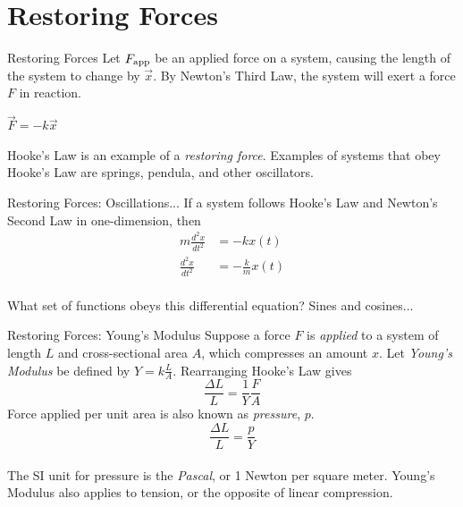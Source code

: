 \documentclass{beamer}
\begin{document}
\section{Restoring Forces}

\begin{frame}{Restoring Forces}
Let $F_{\rm app}$ be an applied force on a system, causing the length of the system to change by $\vec{x}$.  By Newton's Third Law, the system will exert a force $F$ in reaction. \\
\vspace{1cm}
\begin{tcolorbox}[colback=white,colframe=red!40!blue,title=Hooke's Law]
\alert{$\vec{F} = -k\vec{x}$}
\end{tcolorbox}
\vspace{0.5cm}
Hooke's Law is an example of a \textit{restoring force}.  Examples of systems that obey Hooke's Law are springs, pendula, and other oscillators.
\end{frame}

\begin{frame}{Restoring Forces: Oscillations...}
If a system follows Hooke's Law and Newton's Second Law in one-dimension, then \\
\begin{align}
m \frac{d^2x}{dt^2} &= -k x(t) \label{eq:osc1} \\
\frac{d^2x}{dt^2} &= -\frac{k}{m} x(t) \label{eq:osc2}
\end{align} \\
What set of functions obeys this differential equation?  Sines and cosines...
\end{frame}

\begin{frame}{Restoring Forces: Young's Modulus}
Suppose a force $F$ is \textit{applied} to a system of length $L$ and cross-sectional area $A$, which compresses an amount $x$.  Let \textit{Young's Modulus} be defined by $Y = k \frac{L}{A}$.  Rearranging Hooke's Law  gives \\
\begin{equation}
\frac{\Delta L}{L} = \frac{1}{Y}\frac{F}{A}
\end{equation}
\vspace{0.5cm}
Force applied per unit area is also known as \textit{pressure}, $p$.
\begin{equation}
\boxed{\frac{\Delta L}{L} = \frac{p}{Y}}
\label{eq:young}
\end{equation} \\
The SI unit for pressure is the \textit{Pascal}, or 1 Newton per square meter.  Young's Modulus also applies to tension, or the opposite of linear compression.
\end{frame}
\end{document}
